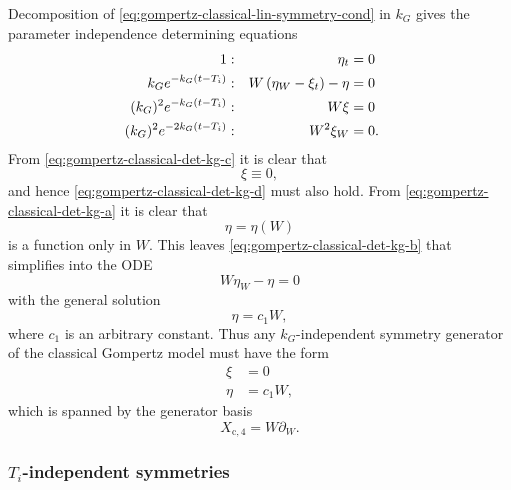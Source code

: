 Decomposition of \cref{eq:gompertz-classical-lin-symmetry-cond} in \(k_G\) gives the parameter independence determining equations
\begin{subequations}
  \begin{flalign}
    1 & : & \eta_t &= 0 && \FlLabel{eq:gompertz-classical-det-kg-a}\\
    k_G e^{-k_G (t - T_i)} & : & W \left(\eta_W - \xi_t\right) - \eta &= 0 && \FlLabel{eq:gompertz-classical-det-kg-b}\\
    (k_G)^2 e^{-k_G (t - T_i)} & : & W \xi &= 0 && \FlLabel{eq:gompertz-classical-det-kg-c}\\
    (k_G)^2 e^{-2k_G (t - T_i)} & : & W^2 \xi_W &= 0. && \FlLabel{eq:gompertz-classical-det-kg-d}
  \end{flalign}
\end{subequations}
From \cref{eq:gompertz-classical-det-kg-c} it is clear that
\begin{equation}
  \xi \equiv 0,
\end{equation}
and hence \cref{eq:gompertz-classical-det-kg-d} must also hold.
From \cref{eq:gompertz-classical-det-kg-a} it is clear that
\begin{equation}
  \eta = \eta(W)
\end{equation}
is a function only in \(W\).
This leaves \cref{eq:gompertz-classical-det-kg-b} that simplifies into the ODE
\begin{equation}
  W \eta_W - \eta = 0
\end{equation}
with the general solution
\begin{equation}
  \eta = c_1 W,
\end{equation}
where \(c_1\) is an arbitrary constant.
Thus any \(k_G\)-independent symmetry generator of the classical Gompertz model  must have the form
\begin{align}
  \xi &= 0 \\
  \eta &= c_1 W,
\end{align}
which is spanned by the generator basis
\begin{equation}
  X_{\text{c},4} = W \partial_W.
\end{equation}

\subsubsection{\texorpdfstring{\(T_i\)-independent symmetries}{Inflection time-independent symmetries}}

